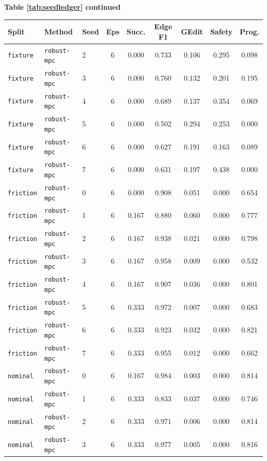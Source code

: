 \documentclass{article}
\begin{document}
\begin{center}
\textbf{Table \ref{tab:seedledger} continued}\\[0.4ex]
\begin{tabular}{lllcccccc}
\toprule
Split & Method & Seed & Eps & Succ. & Edge F1 & GEdit & Safety & Prog. \\
\midrule
\texttt{fixture} & \texttt{robust-mpc} & 2 & 6 & 0.000 & 0.733 & 0.106 & 0.295 & 0.098 \\
\texttt{fixture} & \texttt{robust-mpc} & 3 & 6 & 0.000 & 0.760 & 0.132 & 0.201 & 0.195 \\
\texttt{fixture} & \texttt{robust-mpc} & 4 & 6 & 0.000 & 0.689 & 0.137 & 0.354 & 0.069 \\
\texttt{fixture} & \texttt{robust-mpc} & 5 & 6 & 0.000 & 0.502 & 0.294 & 0.253 & 0.000 \\
\texttt{fixture} & \texttt{robust-mpc} & 6 & 6 & 0.000 & 0.627 & 0.191 & 0.163 & 0.089 \\
\texttt{fixture} & \texttt{robust-mpc} & 7 & 6 & 0.000 & 0.631 & 0.197 & 0.438 & 0.000 \\
\texttt{friction} & \texttt{robust-mpc} & 0 & 6 & 0.000 & 0.908 & 0.051 & 0.000 & 0.654 \\
\texttt{friction} & \texttt{robust-mpc} & 1 & 6 & 0.167 & 0.880 & 0.060 & 0.000 & 0.777 \\
\texttt{friction} & \texttt{robust-mpc} & 2 & 6 & 0.167 & 0.938 & 0.021 & 0.000 & 0.798 \\
\texttt{friction} & \texttt{robust-mpc} & 3 & 6 & 0.167 & 0.958 & 0.009 & 0.000 & 0.532 \\
\texttt{friction} & \texttt{robust-mpc} & 4 & 6 & 0.167 & 0.907 & 0.036 & 0.000 & 0.801 \\
\texttt{friction} & \texttt{robust-mpc} & 5 & 6 & 0.333 & 0.972 & 0.007 & 0.000 & 0.683 \\
\texttt{friction} & \texttt{robust-mpc} & 6 & 6 & 0.333 & 0.923 & 0.032 & 0.000 & 0.821 \\
\texttt{friction} & \texttt{robust-mpc} & 7 & 6 & 0.333 & 0.955 & 0.012 & 0.000 & 0.662 \\
\texttt{nominal} & \texttt{robust-mpc} & 0 & 6 & 0.167 & 0.984 & 0.003 & 0.000 & 0.814 \\
\texttt{nominal} & \texttt{robust-mpc} & 1 & 6 & 0.333 & 0.833 & 0.037 & 0.000 & 0.746 \\
\texttt{nominal} & \texttt{robust-mpc} & 2 & 6 & 0.333 & 0.971 & 0.006 & 0.000 & 0.814 \\
\texttt{nominal} & \texttt{robust-mpc} & 3 & 6 & 0.333 & 0.977 & 0.005 & 0.000 & 0.816 \\

\end{tabular}
\end{center}
\end{document}
